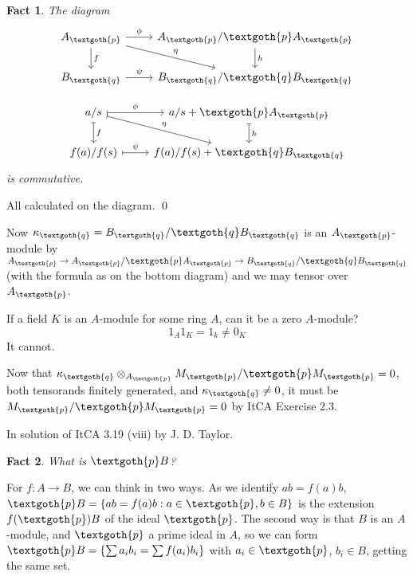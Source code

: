 \documentclass{article}
\newtheorem{theorem}{Fact}[section]
\begin{document}
\bigskip
\begin{theorem}
The diagram
\[
     \begin{tikzcd}
     A_\textgoth{p} \arrow{r}{\phi} \arrow{d}{f} \arrow{dr}{\eta} & A_\textgoth{p}/\textgoth{p}A_\textgoth{p} \arrow{d}{h} \\
     B_\textgoth{q} \arrow{r}{\psi} & B_\textgoth{q}/\textgoth{q}B_\textgoth{q}
     \end{tikzcd}
\]

\[
     \begin{tikzcd}
     a/s \arrow[r, mapsto, "\phi"] \arrow[d, mapsto, "f"] \arrow[dr, mapsto, "\eta"] & a/s + \textgoth{p}A_\textgoth{p} \arrow[d, mapsto, "h"] \\
     f(a)/f(s) \arrow[r, mapsto, "\psi"] & f(a)/f(s) + \textgoth{q}B_\textgoth{q}
     \end{tikzcd}
\]
is commutative.
\end{theorem}

All calculated on the diagram. \qed

Now $\kappa_\textgoth{q} = B_\textgoth{q}/\textgoth{q}B_\textgoth{q}$ is an $A_\textgoth{p}$-module by $A_\textgoth{p} \rightarrow A_\textgoth{p}/\textgoth{p}A_\textgoth{p} \rightarrow B_\textgoth{q}/\textgoth{q}B_\textgoth{q}$ (with the formula as on the bottom diagram) and we may tensor over $A_\textgoth{p}$. 

If a field $K$ is an $A$-module for some ring $A$, can it be a zero $A$-module?
\[
 1_A 1_K = 1_k \ne 0_K
\]
It cannot.

Now that $\kappa_\textgoth{q} \otimes_{A_\textgoth{p}} M_\textgoth{p}/\textgoth{p}M_\textgoth{p} = 0$, both tensorands finitely generated, and $\kappa_\textgoth{q} \ne 0$, it must be $M_\textgoth{p}/\textgoth{p}M_\textgoth{p} = 0$ by ItCA Exercise 2.3. 

In solution of ItCA 3.19 (viii) by J. D. Taylor.

\bigskip
\begin{theorem}
What is $\textgoth{p} B$?
\end{theorem}

For $f: A \rightarrow B$, we can think in two ways. As we identify $ab = f(a)b$,  $\textgoth{p} B = \{ ab = f(a)b : a \in \textgoth{p}, b \in B \}$ is the extension $f(\textgoth{p}) B$ of the ideal $\textgoth{p}$. The second way is that $B$ is an $A$-module, and $\textgoth{p}$ a prime ideal in $A$, so we can form $ \textgoth{p} B = \{ \sum a_i b_i = \sum f(a_i)b_i \} $ with $a_i \in \textgoth{p}$, $b_i \in B$, getting the same set.
\end{document}
